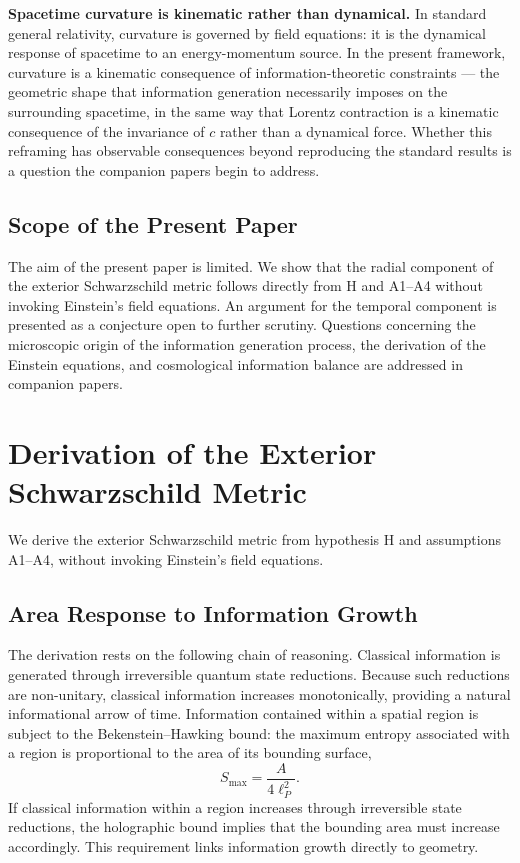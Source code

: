 \documentclass[12pt]{article}
\begin{document}
\medskip
\noindent\textbf{Spacetime curvature is kinematic rather than
dynamical.}
In standard general relativity, curvature is governed by field
equations: it is the dynamical response of spacetime to an
energy-momentum source.
In the present framework, curvature is a kinematic consequence of
information-theoretic constraints --- the geometric shape that
information generation necessarily imposes on the surrounding
spacetime, in the same way that Lorentz contraction is a kinematic
consequence of the invariance of $c$ rather than a dynamical force.
Whether this reframing has observable consequences beyond reproducing
the standard results is a question the companion papers begin to
address.

\subsection{Scope of the Present Paper}
\label{sec:scope}

The aim of the present paper is limited.
We show that the radial component of the exterior Schwarzschild metric
follows directly from H and A1--A4 without invoking Einstein's field
equations.
An argument for the temporal component is presented as a conjecture
open to further scrutiny.
Questions concerning the microscopic origin of the information
generation process, the derivation of the Einstein equations, and
cosmological information balance are addressed in companion papers.

\section{Derivation of the Exterior Schwarzschild Metric}

We derive the exterior Schwarzschild metric from hypothesis H and
assumptions A1--A4, without invoking Einstein's field equations.

\subsection{Area Response to Information Growth}
\label{sec:area-response}

The derivation rests on the following chain of reasoning.
Classical information is generated through irreversible quantum state
reductions.
Because such reductions are non-unitary, classical information
increases monotonically, providing a natural informational arrow of
time.
Information contained within a spatial region is subject to the
Bekenstein--Hawking bound: the maximum entropy associated with a
region is proportional to the area of its bounding surface,
\begin{equation}
  S_{\max} = \frac{A}{4\ell_P^2}.
  \label{eq:bekenstein-hawking}
\end{equation}
If classical information within a region increases through irreversible
state reductions, the holographic bound implies that the bounding area
must increase accordingly.
This requirement links information growth directly to geometry.
\end{document}
